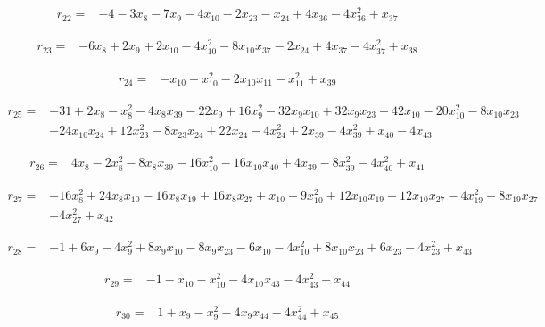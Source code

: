 \documentclass[10pt,letterpaper]{article}
\theoremstyle{remark}\newtheorem{remark}[theorem]{Remark}
\begin{document}
\begin{align*}
r_{22}={}&-4-3x_{8}-7x_{9}-4x_{10}-2x_{23}-x_{24}+4x_{36}-4x_{36}^{2}+x_{37}
\end{align*}

\begin{align*}
r_{23}={}&-6x_{8}+2x_{9}+2x_{10}-4x_{10}^{2}-8x_{10}x_{37}-2x_{24}+4x_{37}-4x_{37}^{2}+x_{38}
\end{align*}

\begin{align*}
r_{24}={}&-x_{10}-x_{10}^{2}-2x_{10}x_{11}-x_{11}^{2}+x_{39}
\end{align*}

\begin{align*}
r_{25}={}&-31+2x_{8}-x_{8}^{2}-4x_{8}x_{39}-22x_{9}+16x_{9}^{2}-32x_{9}x_{10}+32x_{9}x_{23}-42x_{10}-20x_{10}^{2}-8x_{10}x_{23}\\
&+24x_{10}x_{24}+12x_{23}^{2}-8x_{23}x_{24}+22x_{24}-4x_{24}^{2}+2x_{39}-4x_{39}^{2}+x_{40}-4x_{43}
\end{align*}

\begin{align*}
r_{26}={}&4x_{8}-2x_{8}^{2}-8x_{8}x_{39}-16x_{10}^{2}-16x_{10}x_{40}+4x_{39}-8x_{39}^{2}-4x_{40}^{2}+x_{41}
\end{align*}

\begin{align*}
r_{27}={}&-16x_{8}^{2}+24x_{8}x_{10}-16x_{8}x_{19}+16x_{8}x_{27}+x_{10}-9x_{10}^{2}+12x_{10}x_{19}-12x_{10}x_{27}-4x_{19}^{2}+8x_{19}x_{27}\\
&-4x_{27}^{2}+x_{42}
\end{align*}

\begin{align*}
r_{28}={}&-1+6x_{9}-4x_{9}^{2}+8x_{9}x_{10}-8x_{9}x_{23}-6x_{10}-4x_{10}^{2}+8x_{10}x_{23}+6x_{23}-4x_{23}^{2}+x_{43}
\end{align*}

\begin{align*}
r_{29}={}&-1-x_{10}-x_{10}^{2}-4x_{10}x_{43}-4x_{43}^{2}+x_{44}
\end{align*}

\begin{align*}
r_{30}={}&1+x_{9}-x_{9}^{2}-4x_{9}x_{44}-4x_{44}^{2}+x_{45}
\end{align*}
\end{document}
